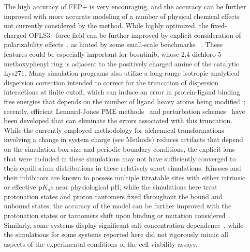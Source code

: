 \documentclass[phd,tocprelim]{cornell}
\begin{document}
The high accuracy of FEP+ is very encouraging, and the accuracy can be further improved with more accurate modeling of a number of physical chemical effects not currently considered by the method. 
While highly optimized, the fixed-charged OPLS3~\citep{Harder:J.Chem.TheoryComput.:2016} force field can be further improved by explicit consideration of polarizability effects~\citep{zotero-1853851-9627}, as hinted by some small-scale benchmarks ~\citep{Jiao:Proc.Natl.Acad.Sci.:2008}.
These features could be especially important for bosutinib, whose 2,4-dichloro-5-methoxyphenyl ring is adjacent to the positively charged amine of the catalytic Lys271.
Many simulation programs also utilize a long-range isotropic analytical dispersion correction intended to correct for the truncation of dispersion interactions at finite cutoff, which can induce an error in protein-ligand binding free energies that depends on the number of ligand heavy atoms being modified~\citep{Shirts:J.Phys.Chem.B:2007}; recently, efficient Lennard-Jones PME methods~\citep{Essmann:J.Chem.Phys.:1995,Wennberg:J.Chem.TheoryComput.:2013} and perturbation schemes~\citep{Shirts:J.Phys.Chem.B:2007} have been developed that can eliminate the errors associated with this truncation.
While the currently employed methodology for alchemical transformations involving a change in system charge (see Methods) reduces artifacts that depend on the simulation box size and periodic boundary conditions, the explicit ions that were included in these simulations may not have sufficiently converged to their equilibrium distributions in these relatively short simulations.
Kinases and their inhibitors are known to possess multiple titratable sites with either intrinsic or effective p$K_{a}$s near physiological pH, while the simulations here treat protonation states and proton tautomers fixed throughout the bound and unbound states; the accuracy of the model can be further improved with the protonation states or tautomers shift  upon binding or mutation considered~\citep{Onufriev:Q.Rev.Biophys.:2013,Martin:2009:JournalofComputer-AidedMolecularDesign}.
Similarly, some systems display significant salt concentration dependence~\citep{Jensen:Curr.Pharm.Biotechnol.:2008a}, while the simulations for some systems reported here did not rigorously mimic all aspects of the experimental conditions of the cell viability assays.
\end{document}
